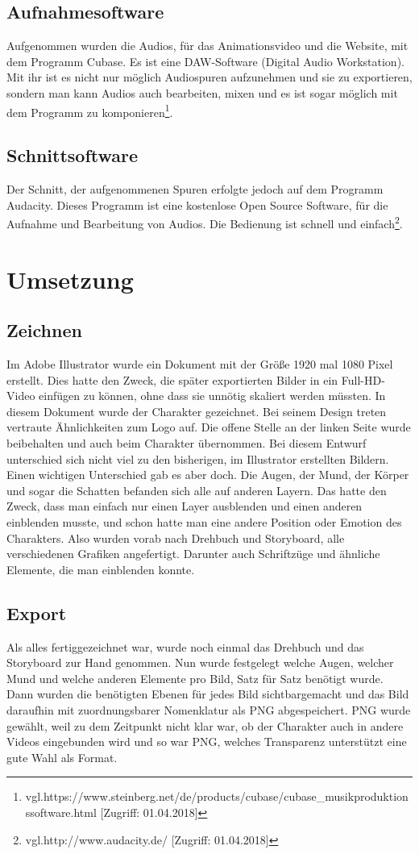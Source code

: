 \subsection{Aufnahmesoftware}
Aufgenommen wurden die Audios, für das Animationsvideo und die Website, mit dem Programm Cubase. Es ist eine DAW-Software (Digital Audio Workstation). Mit ihr ist es nicht nur möglich Audiospuren aufzunehmen und sie zu exportieren, sondern man kann Audios auch bearbeiten, mixen und es ist sogar möglich mit dem Programm zu komponieren\footnote{\label{} vgl.https://www.steinberg.net/de/products/cubase/cubase\_musikproduktionssoftware.html [Zugriff: 01.04.2018]}.
\subsection{Schnittsoftware}
Der Schnitt, der aufgenommenen Spuren erfolgte jedoch auf dem Programm Audacity. Dieses Programm ist eine kostenlose Open Source Software, für die Aufnahme und Bearbeitung von Audios. Die Bedienung ist schnell und einfach\footnote{\label{} vgl.http://www.audacity.de/ [Zugriff: 01.04.2018]}.
\section{Umsetzung}
\subsection{Zeichnen}
Im Adobe Illustrator wurde ein Dokument mit der Größe 1920 mal 1080 Pixel erstellt. Dies hatte den Zweck, die später exportierten Bilder in ein Full-HD-Video einfügen zu können, ohne dass sie unnötig skaliert werden müssten. In diesem Dokument wurde der Charakter gezeichnet. Bei seinem Design treten vertraute Ähnlichkeiten zum Logo auf. Die offene Stelle an der linken Seite wurde beibehalten und auch beim Charakter übernommen. Bei diesem Entwurf unterschied sich nicht viel zu den bisherigen, im Illustrator erstellten Bildern. Einen wichtigen Unterschied gab es aber doch. Die Augen, der Mund, der Körper und sogar die Schatten befanden sich alle auf anderen Layern. Das hatte den Zweck, dass man einfach nur einen Layer ausblenden und einen anderen einblenden musste, und schon hatte man eine andere Position oder Emotion des Charakters. Also wurden vorab nach Drehbuch und Storyboard, alle verschiedenen Grafiken angefertigt. Darunter auch Schriftzüge und ähnliche Elemente, die man einblenden konnte.
\subsection{Export}
Als alles fertiggezeichnet war, wurde noch einmal das Drehbuch und das Storyboard zur Hand genommen. Nun wurde festgelegt welche Augen, welcher Mund und welche anderen Elemente pro Bild, Satz für Satz benötigt wurde. Dann wurden die benötigten Ebenen für jedes Bild sichtbargemacht und das Bild daraufhin mit zuordnungsbarer Nomenklatur als PNG abgespeichert. PNG wurde gewählt, weil zu dem Zeitpunkt nicht klar war, ob der Charakter auch in andere Videos eingebunden wird und so war PNG, welches Transparenz unterstützt eine gute Wahl als Format.
